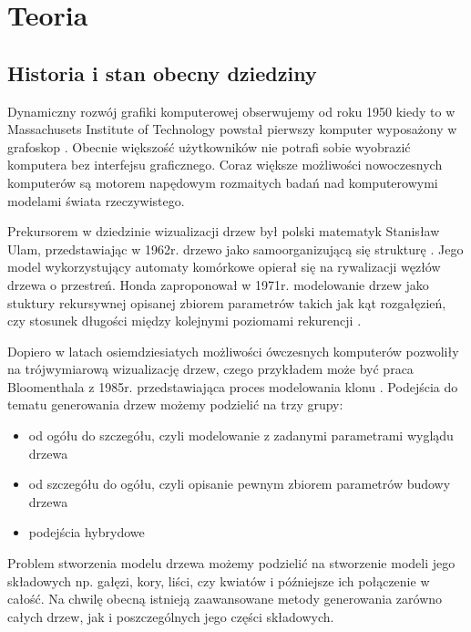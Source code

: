 \chapter{Teoria}



\section{Historia i stan obecny dziedziny}
Dynamiczny rozwój grafiki komputerowej obserwujemy od roku 1950 kiedy to w Massachusets Institute of Technology  powstał pierwszy
komputer wyposażony w grafoskop \cite{jankowski}. Obecnie większość użytkowników nie potrafi sobie wyobrazić komputera bez interfejsu graficznego.
Coraz większe możliwości nowoczesnych komputerów są motorem napędowym rozmaitych badań nad komputerowymi modelami świata rzeczywistego.

Prekursorem w dziedzinie wizualizacji drzew był polski matematyk Stanisław Ulam, przedstawiając w 1962r. drzewo jako samoorganizującą się
strukturę \cite{ulam}. Jego model wykorzystujący automaty komórkowe opierał się na rywalizacji węzłów  drzewa o przestreń.
Honda zaproponował w 1971r. modelowanie drzew jako stuktury rekursywnej opisanej
zbiorem parametrów takich jak kąt rozgałęzień, czy stosunek długości między kolejnymi poziomami rekurencji \cite{honda}.

Dopiero w latach osiemdziesiatych
możliwości ówczesnych komputerów pozwoliły na trójwymiarową wizualizację drzew, czego przykładem może być praca Bloomenthala z 1985r. 
przedstawiająca proces modelowania klonu \cite{bloomenthal}. Podejścia do tematu generowania drzew możemy podzielić na trzy grupy:
\begin{itemize}
\item od ogółu do szczegółu, czyli modelowanie z zadanymi parametrami wyglądu drzewa
\item od szczegółu do ogółu, czyli opisanie pewnym zbiorem parametrów budowy drzewa
\item podejścia hybrydowe
\end{itemize}
Problem stworzenia modelu drzewa możemy podzielić na stworzenie modeli jego składowych np. gałęzi, kory, liści, czy kwiatów i późniejsze
ich połączenie w całość. Na chwilę obecną istnieją zaawansowane metody generowania zarówno całych drzew, jak i poszczególnych jego części składowych.

